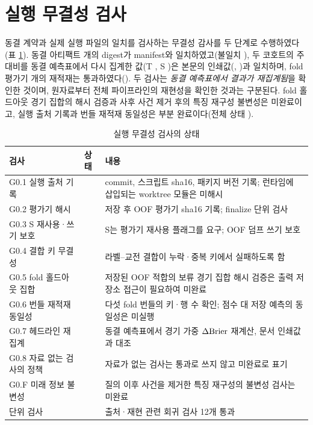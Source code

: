 \section{실행 무결성 검사}

동결 계약과 실제 실행 파일의 일치를 검사하는 무결성 감사를 두 단계로 수행하였다(표 \ref{tab:g0-integrity}). 동결 아티팩트 \gzDigestN{}개의 digest가 manifest와 일치하였고(불일치 \gzDigestDiff{}), 두 코호트의 주 대비를 동결 예측표에서 다시 집계한 값(T \gzReaggT{}, S \gzReaggS{})은 본문의 인쇄값(\gzPrintT{}, \gzPrintS{})과 일치하며, fold 평가기 \gzFoldN{}개의 재적재는 통과하였다(\texttt{\gzOofStatus{}}). 두 검사는 \emph{동결 예측표에서 결과가 재집계됨}을 확인한 것이며, 원자료부터 전체 파이프라인의 재현성을 확인한 것과는 구분된다. fold 홀드아웃 경기 집합의 해시 검증과 사후 사건 제거 후의 특징 재구성 불변성은 미완료이고, 실행 출처 기록과 번들 재적재 동일성은 부분 완료이다(전체 상태 \texttt{\gzOverall{}}).

\begin{table}[H]
  \centering
  \caption{실행 무결성 검사의 상태}
  \label{tab:g0-integrity}
  \small
  \begin{tabularx}{\linewidth}{@{}llX@{}}
    \toprule
    검사 & 상태 & 내용 \\
    \midrule
    G0.1 실행 출처 기록 & \texttt{\gzStatusOne{}} & commit, 스크립트 sha16, 패키지 버전 기록; 런타임에 삽입되는 worktree 모듈은 미해시 \\
    G0.2 평가기 해시 & \texttt{\gzStatusTwo{}} & 저장 후 OOF 평가기 sha16 기록; finalize 단위 검사 \\
    G0.3 S 재사용·쓰기 보호 & \texttt{\gzStatusThree{}} & S는 평가기 재사용 플래그를 요구; OOF 덤프 쓰기 보호 \\
    G0.4 결합 키 무결성 & \texttt{\gzStatusFour{}} & 라벨--교전 결합이 누락·중복 키에서 실패하도록 함 \\
    G0.5 fold 홀드아웃 집합 & \texttt{\gzStatusFive{}} & 저장된 OOF 적합의 보류 경기 집합 해시 검증은 출력 저장소 접근이 필요하여 미완료 \\
    G0.6 번들 재적재 동일성 & \texttt{\gzStatusSix{}} & 다섯 fold 번들의 키·행 수 확인; 점수 대 저장 예측의 동일성은 미실행 \\
    G0.7 헤드라인 재집계 & \texttt{\gzStatusSeven{}} & 동결 예측표에서 경기 가중 $\Delta\mathrm{Brier}$ 재계산, 문서 인쇄값과 대조 \\
    G0.8 자료 없는 검사의 정책 & \texttt{\gzStatusEight{}} & 자료가 없는 검사는 통과로 쓰지 않고 미완료로 표기 \\
    G0.F 미래 정보 불변성 & \texttt{\gzStatusFuture{}} & 질의 이후 사건을 제거한 특징 재구성의 불변성 검사는 미완료 \\
    단위 검사 & \texttt{\gzStatusUnit{}} & 출처·재현 관련 회귀 검사 12개 통과 \\
    \bottomrule
  \end{tabularx}
\end{table}

